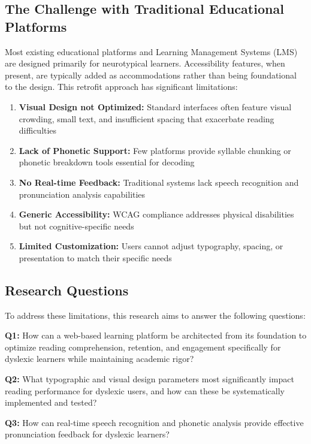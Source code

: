 \documentclass[journal]{IEEEtran}
\begin{document}
\subsection{The Challenge with Traditional Educational Platforms}

Most existing educational platforms and Learning Management Systems (LMS) are designed primarily for neurotypical learners. Accessibility features, when present, are typically added as accommodations rather than being foundational to the design. This retrofit approach has significant limitations:

\begin{enumerate}
    \item \textbf{Visual Design not Optimized:} Standard interfaces often feature visual crowding, small text, and insufficient spacing that exacerbate reading difficulties
    \item \textbf{Lack of Phonetic Support:} Few platforms provide syllable chunking or phonetic breakdown tools essential for decoding
    \item \textbf{No Real-time Feedback:} Traditional systems lack speech recognition and pronunciation analysis capabilities
    \item \textbf{Generic Accessibility:} WCAG compliance addresses physical disabilities but not cognitive-specific needs
    \item \textbf{Limited Customization:} Users cannot adjust typography, spacing, or presentation to match their specific needs
\end{enumerate}

\subsection{Research Questions}

To address these limitations, this research aims to answer the following questions:

\textbf{Q1:} How can a web-based learning platform be architected from its foundation to optimize reading comprehension, retention, and engagement specifically for dyslexic learners while maintaining academic rigor?

\textbf{Q2:} What typographic and visual design parameters most significantly impact reading performance for dyslexic users, and how can these be systematically implemented and tested?

\textbf{Q3:} How can real-time speech recognition and phonetic analysis provide effective pronunciation feedback for dyslexic learners?
\end{document}
